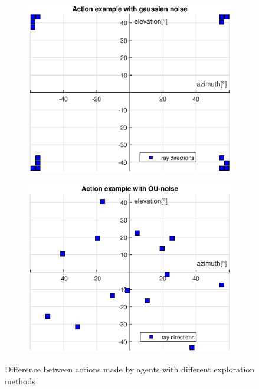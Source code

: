 \begin{figure}[H]
\begin{subfigure}[h]{0.5\linewidth}
\includegraphics[width=\linewidth]{fig/wrong_action.eps}
\end{subfigure}
\hfill
\begin{subfigure}[h]{0.5\linewidth}
\includegraphics[width=\linewidth]{fig/right_action.eps}
\end{subfigure}
\captionsetup{width=1\textwidth}
\caption{Difference between actions made by agents with different exploration methods}
\label{fig:expdiff}
\end{figure}